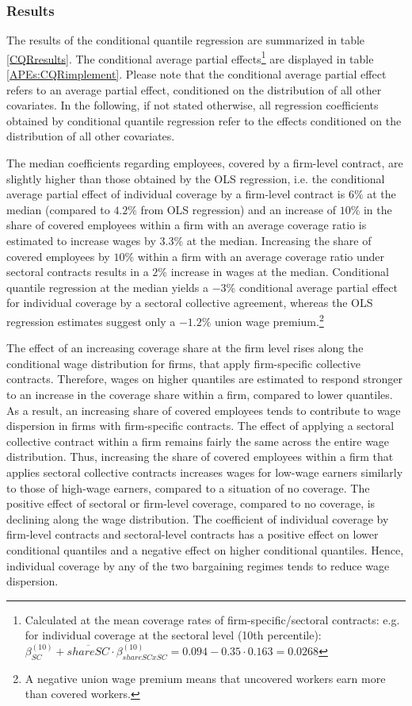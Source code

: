 \subsubsection*{Results}
The results of the conditional quantile regression are summarized in table \ref{CQRresults}. The conditional average partial effects\footnote{Calculated at the mean coverage rates of firm-specific/sectoral contracts: e.g. for individual coverage at the sectoral level (10th percentile): $\beta_{SC}^{(10)}+\overline{shareSC}\cdot \beta_{shareSCxSC}^{(10)}=0.094-0.35 \cdot 0.163=0.0268$} are displayed in table \ref{APEs:CQRimplement}. Please note that the conditional average partial effect refers to an average partial effect, conditioned on the distribution of all other covariates. In the following, if not stated otherwise, all regression coefficients obtained by conditional quantile regression refer to the effects conditioned on the distribution of all other covariates.

The median coefficients regarding employees, covered by a firm-level contract, are slightly higher than those obtained by the OLS regression, i.e. the conditional average partial effect of individual coverage by a firm-level contract is $6\%$ at the median (compared to $4.2\%$ from OLS regression) and an increase of $10\%$ in the share of covered employees within a firm with an average coverage ratio is estimated to increase wages by $3.3\%$ at the median. Increasing the share of covered employees by $10\%$ within a firm with an average coverage ratio under sectoral contracts results in a $2\%$ increase in wages at the median. Conditional quantile regression at the median yields a $-3\%$ conditional average partial effect for individual coverage by a sectoral collective agreement, whereas the OLS regression estimates suggest only a $-1.2\%$ union wage premium.\footnote{ A negative union wage premium means that uncovered workers earn more than covered workers.}

The effect of an increasing coverage share at the firm level rises along the conditional wage distribution for firms, that apply firm-specific collective contracts. Therefore, wages on higher quantiles are estimated to respond stronger to an increase in the coverage share within a firm, compared to lower quantiles. As a result, an increasing share of covered employees tends to contribute to wage dispersion in firms with firm-specific contracts. The effect of applying a sectoral collective contract within a firm remains fairly the same across the entire wage distribution. Thus, increasing the share of covered employees within a firm that applies sectoral collective contracts increases wages for low-wage earners similarly to those of high-wage earners, compared to a situation of no coverage. The positive effect of sectoral or firm-level coverage, compared to no coverage, is declining along the wage distribution. The coefficient of individual coverage by firm-level contracts and sectoral-level contracts has a positive effect on lower conditional quantiles and a negative effect on higher conditional quantiles. Hence, individual coverage by any of the two bargaining regimes tends to reduce wage dispersion.

